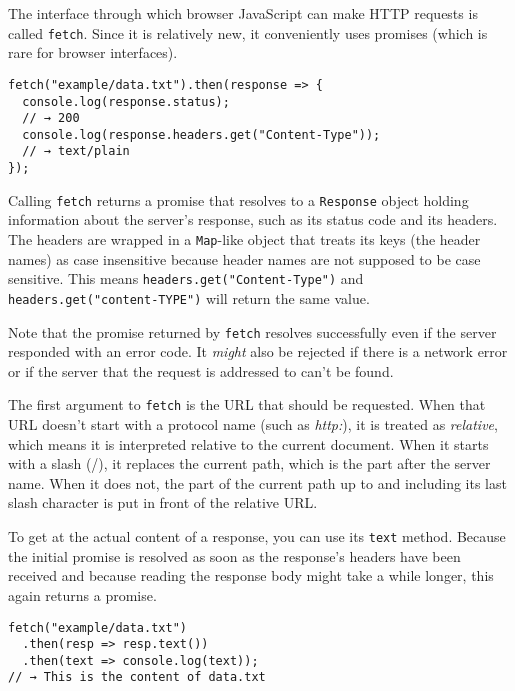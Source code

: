 The interface through which browser JavaScript can make HTTP requests is called \lstinline`fetch`. Since it is relatively new, it conveniently uses promises (which is rare for browser interfaces).

\begin{lstlisting}
fetch("example/data.txt").then(response => {
  console.log(response.status);
  // → 200
  console.log(response.headers.get("Content-Type"));
  // → text/plain
});
\end{lstlisting}
\noindent{}

Calling \lstinline`fetch` returns a promise that resolves to a \lstinline`Response` object holding information about the server's response, such as its status code and its headers. The headers are wrapped in a \lstinline`Map`-like object that treats its keys (the header names) as case insensitive because header names are not supposed to be case sensitive. This means \lstinline`headers.get("Content-Type")` and \lstinline`headers.get("content-TYPE")` will return the same value.

Note that the promise returned by \lstinline`fetch` resolves successfully even if the server responded with an error code. It \emph{might} also be rejected if there is a network error or if the server that the request is addressed to can't be found.

The first argument to \lstinline`fetch` is the URL that should be requested. When that URL doesn't start with a protocol name (such as \emph{http:}), it is treated as \emph{relative}, which means it is interpreted relative to the current document. When it starts with a slash (/), it replaces the current path, which is the part after the server name. When it does not, the part of the current path up to and including its last slash character is put in front of the relative URL.

To get at the actual content of a response, you can use its \lstinline`text` method. Because the initial promise is resolved as soon as the response's headers have been received and because reading the response body might take a while longer, this again returns a promise.

\begin{lstlisting}
fetch("example/data.txt")
  .then(resp => resp.text())
  .then(text => console.log(text));
// → This is the content of data.txt
\end{lstlisting}
\noindent{}


